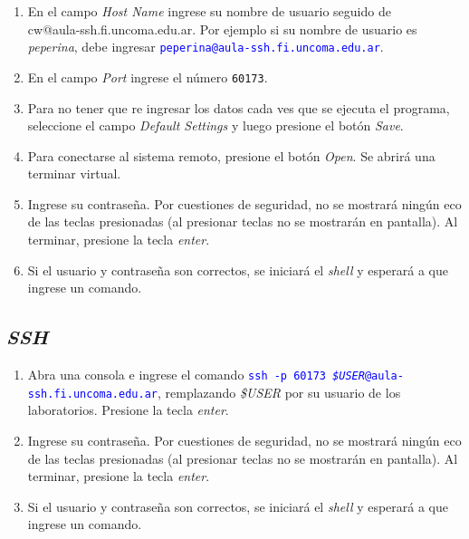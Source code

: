 \documentclass[12pt]{article}
\newcommand{\cw}[1]{\texttt{\textcolor{blue}{#1}}}
\begin{document}
\begin{enumerate}
\begin{figure}[!htb]
\end{figure}


    \item En el campo \emph{Host Name} ingrese su nombre de usuario seguido de
        \\cw{@aula-ssh.fi.uncoma.edu.ar}. Por ejemplo si su nombre de
        usuario es \emph{peperina}, debe ingresar
        \cw{peperina@aula-ssh.fi.uncoma.edu.ar}.

    \item En el campo \emph{Port} ingrese el número \texttt{60173}.

    \item Para no tener que re ingresar los datos cada ves que se ejecuta el
        programa, seleccione el campo \emph{Default Settings} y luego presione
        el botón \emph{Save}.

    \item Para conectarse al sistema remoto, presione el botón \emph{Open}. Se
        abrirá una terminar virtual.

    \item Ingrese su contraseña. Por cuestiones de seguridad, no se mostrará
        ningún eco de las teclas presionadas (al presionar teclas no se
        mostrarán en pantalla). Al terminar, presione la tecla 
        \emph{enter}.

    \item Si el usuario y contraseña son correctos, se iniciará el
        \emph{shell} y esperará a que ingrese un comando.

\end{enumerate}

\subsection*{\emph{SSH}}

\begin{enumerate}
    \item Abra una consola e ingrese el comando \cw{ssh -p 60173
        \emph{\$USER}@aula-ssh.fi.uncoma.edu.ar}, remplazando \emph{\$USER}
        por su usuario de los laboratorios. Presione la tecla \emph{enter}.

    \item Ingrese su contraseña. Por cuestiones de seguridad, no se mostrará
        ningún eco de las teclas presionadas (al presionar teclas no se
        mostrarán en pantalla). Al terminar, presione la tecla 
        \emph{enter}.

    \item Si el usuario y contraseña son correctos, se iniciará el
        \emph{shell} y esperará a que ingrese un comando.

\end{enumerate}
\end{document}
